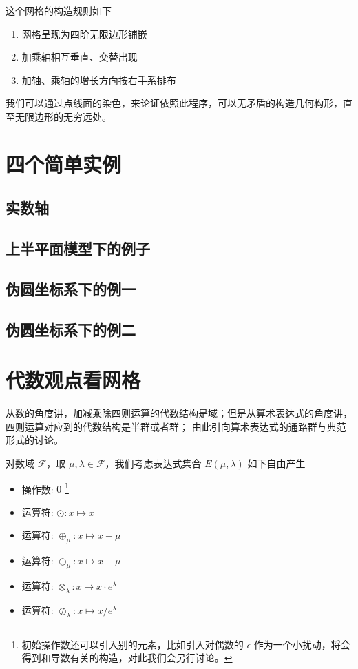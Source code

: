 \documentclass[a4paper,12pt]{article}
\numberwithin{definition}{section}
\numberwithin{lemma}{section}
\numberwithin{proposition}{section}
\numberwithin{theorem}{section}
\numberwithin{grammar}{section}
\numberwithin{program}{section}
\numberwithin{convention}{section}
\numberwithin{corollary}{section}
\begin{document}
这个网格的构造规则如下
\begin{enumerate}
    \item 网格呈现为四阶无限边形铺嵌
    \item 加乘轴相互垂直、交替出现
    \item 加轴、乘轴的增长方向按右手系排布
\end{enumerate}

我们可以通过点线面的染色，来论证依照此程序，可以无矛盾的构造几何构形，直至无限边形的无穷远处。

\newpage

\section{四个简单实例}

\subsection{实数轴}

\subsection{上半平面模型下的例子}

\subsection{伪圆坐标系下的例一}

\subsection{伪圆坐标系下的例二}

\newpage

\section{代数观点看网格}

从数的角度讲，加减乘除四则运算的代数结构是域；但是从算术表达式的角度讲，四则运算对应到的代数结构是半群或者群；
由此引向算术表达式的通路群与典范形式的讨论。

对数域 $\mathcal{F}$，取 $\mu, \lambda \in \mathcal{F}$，我们考虑表达式集合 $E(\mu, \lambda)$ 如下自由产生
\begin{itemize}
    \item 操作数: $0$ \footnote[1]{初始操作数还可以引入别的元素，比如引入对偶数的 $\epsilon$ 作为一个小扰动，将会得到和导数有关的构造，对此我们会另行讨论。}
    \item 运算符: $\odot: x \mapsto x$
    \item 运算符: $\oplus_\mu: x \mapsto x + \mu$
    \item 运算符: $\ominus_\mu: x \mapsto x - \mu$
    \item 运算符: $\otimes_\lambda: x \mapsto x \cdot e^\lambda$
    \item 运算符: $\oslash_\lambda: x \mapsto x / e^\lambda$
\end{itemize}
\end{document}
